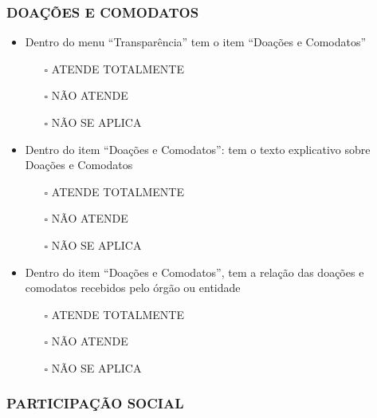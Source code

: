 \documentclass[
]{book}
\providecommand{\tightlist}{%
  \setlength{\itemsep}{0pt}\setlength{\parskip}{0pt}}
\begin{document}
\hypertarget{doauxe7uxf5es-e-comodatos-1}{%
\subsubsection*{DOAÇÕES E COMODATOS}\label{doauxe7uxf5es-e-comodatos-1}}

\begin{itemize}
\tightlist
\item
  Dentro do menu ``Transparência'' tem o item ``Doações e Comodatos''

  \begin{itemize}
  \tightlist
  \item[$\square$]
    ATENDE TOTALMENTE
  \item[$\square$]
    NÃO ATENDE
  \item[$\square$]
    NÃO SE APLICA
  \end{itemize}
\item
  Dentro do item ``Doações e Comodatos'': tem o texto explicativo sobre Doações e Comodatos

  \begin{itemize}
  \tightlist
  \item[$\square$]
    ATENDE TOTALMENTE
  \item[$\square$]
    NÃO ATENDE
  \item[$\square$]
    NÃO SE APLICA
  \end{itemize}
\item
  Dentro do item ``Doações e Comodatos'', tem a relação das doações e comodatos recebidos pelo órgão ou entidade

  \begin{itemize}
  \tightlist
  \item[$\square$]
    ATENDE TOTALMENTE
  \item[$\square$]
    NÃO ATENDE
  \item[$\square$]
    NÃO SE APLICA
  \end{itemize}
\end{itemize}

\hypertarget{participauxe7uxe3o-social-1}{%
\subsubsection*{PARTICIPAÇÃO SOCIAL}\label{participauxe7uxe3o-social-1}}
\end{document}
